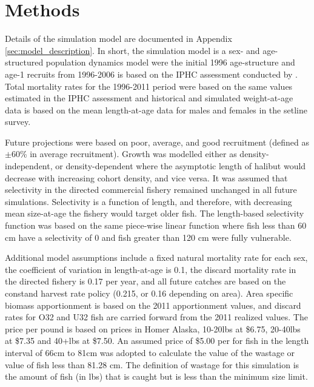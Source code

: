 \section{Methods} %
\label{sec:methods}

Details of the simulation model are documented in Appendix \ref{sec:model_description}.  In short, the simulation model is a sex- and age-structured population dynamics model were the initial 1996 age-structure and age-1 recruits from 1996-2006 is based on the IPHC assessment conducted by \cite{Hare2012Rara}.  Total mortality rates for the 1996-2011 period were based on the same values estimated in the IPHC assessment and historical and simulated weight-at-age data is based on the mean length-at-age data  for males and females  in the setline survey.  

Future projections were based on poor, average, and good recruitment (defined as $\pm$60\% in average recruitment).  Growth was modelled either as density-independent, or density-dependent where the asymptotic length of halibut would decrease with increasing cohort density, and vice versa.  It was assumed that selectivity in the directed commercial fishery remained unchanged in all future simulations.  Selectivity is a function of length, and therefore, with decreasing mean size-at-age the fishery would target older fish.  The length-based selectivity function was based on the same piece-wise linear function where fish less than 60 cm have a selectivity of 0 and fish greater than 120 cm were fully vulnerable.  

Additional model assumptions include a fixed natural mortality rate for each sex, the coefficient of variation in length-at-age is 0.1, the discard mortality rate in the directed fishery is 0.17 per year, and all future catches are based on the constand harvest rate policy (0.215, or 0.16 depending on area).  Area specific biomass apportionment is based on the 2011 apportionment values, and discard rates for O32 and U32 fish are carried forward from the 2011 realized values. The price per pound is based on prices in Homer Alaska, 10-20lbs at \$6.75, 20-40lbs at \$7.35 and 40+lbs at \$7.50.  An assumed price of \$5.00 per for fish in the length interval of 66cm to 81cm was adopted to calculate the value of the wastage or value of fish less than 81.28 cm.  The definition of wastage for this simulation is the amount of fish (in lbs) that is caught but is less than the minimum size limit.

